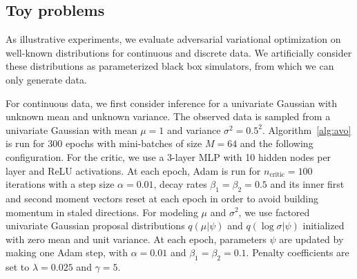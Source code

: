\documentclass[twocolumn,superscriptaddress,aps]{revtex4-1}
\theoremstyle{plain}
\begin{document}
\subsection{Toy problems}

As illustrative experiments, we evaluate adversarial variational optimization on
well-known distributions for continuous and discrete data. We artificially
consider these distributions as parameterized black box simulators, from which
we can only generate data.

For continuous data, we first consider inference for
a univariate Gaussian with unknown mean and
unknown variance. The observed data is sampled from a univariate Gaussian with
mean $\mu = 1$ and variance $\sigma^2 = 0.5^2$. Algorithm~\ref{alg:avo} is run
for 300 epochs with mini-batches of size $M=64$ and the following configuration.
For the critic, we use a 3-layer MLP with 10 hidden nodes per layer and ReLU
activations. At each epoch, Adam is run for $n_\text{critic}=100$ iterations
with a step size $\alpha=0.01$, decay rates $\beta_1=\beta_2=0.5$ and its inner
first and second moment vectors reset at each epoch in order to avoid building
momentum in staled directions.  For modeling $\mu$ and $\sigma^2$, we use
factored univariate Gaussian proposal distributions $q(\mu|\psi)$ and $q(\log
\sigma|\psi)$ initialized with zero mean and unit variance. At each epoch,
parameters $\psi$ are updated by making one Adam step, with $\alpha=0.01$ and
$\beta_1=\beta_2=0.1$. Penalty coefficients are set to $\lambda=0.025$ and
$\gamma=5$.
\end{document}
